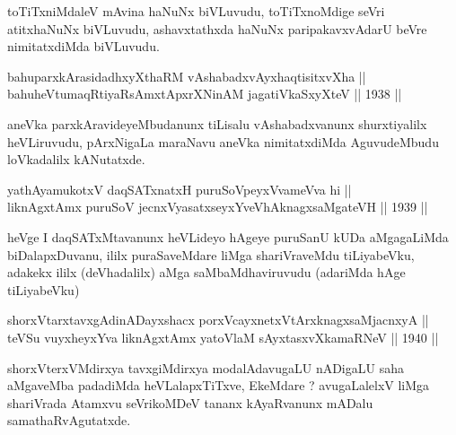 \begin{artha}
toTiTxniMdaleV mAvina haNuNx biVLuvudu, toTiTxnoMdige seVri atitxhaNuNx
biVLuvudu, ashavxtathxda haNuNx paripakavxvAdarU beVre nimitatxdiMda
biVLuvudu.
\end{artha}

\begin{shl}
bahuparxkArasidadhxyXthaRM vAshabadxvAyxhaqtisitxvXha ||  \\
bahuheVtumaqRtiyaRsAmxtApxrXNinAM jagatiVkaSxyXteV \hfill || 1938 ||
  
\end{shl}

\begin{artha}
aneVka parxkAravideyeMbudanunx tiLisalu vAshabadxvanunx shurxtiyalilx
heVLiruvudu, pArxNigaLa maraNavu aneVka nimitatxdiMda AguvudeMbudu
loVkadalilx kANutatxde.
\end{artha}

\begin{shl}
yathA\s yamukotxV daqSATxnatxH puruSoV\s peyxVvameVva hi ||  \\
liknAgxtAmx puruSoV jecnxVyasatxseyxYveVhAknagxsaMgateVH \hfill || 1939 ||
  
\end{shl}

\begin{artha}
heVge I daqSATxMtavanunx heVLideyo hAgeye puruSanU kUDa aMgagaLiMda
biDalapxDuvanu, ililx puraSaveMdare liMga shariVraveMdu tiLiyabeVku,
adakekx ililx (deVhadalilx) aMga saMbaMdhaviruvudu (adariMda hAge tiLiyabeVku)
\end{artha}


\begin{shl}
shorxVtarxtavxgAdinADayxshacx porxVcayxnetxV\s tArxknagxsaMjacnxyA || \\
teVSu vuyxheyxYva liknAgxtAmx yatoV\s laM sAyxtasxvXkamaRNeV \hfill || 1940 ||
  
\end{shl}

\begin{artha}
shorxVterxVMdirxya tavxgiMdirxya modalAdavugaLU nADigaLU saha aMgaveMba
padadiMda heVLalapxTiTxve, EkeMdare ? avugaLalelxV liMga shariVrada
Atamxvu seVrikoMDeV tananx kAyaRvanunx mADalu samathaRvAgutatxde.
\end{artha}


